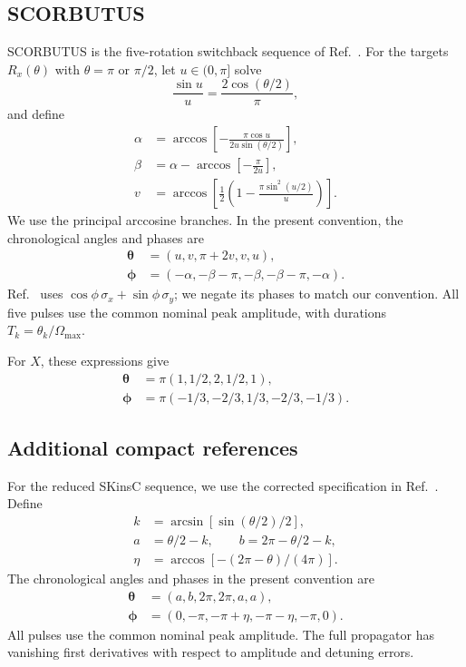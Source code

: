 \documentclass[10pt,aps,twocolumn,pra,floatfix,superscriptaddress]{revtex4-2}
\begin{document}
\subsection{SCORBUTUS}

SCORBUTUS is the five-rotation switchback sequence of
Ref.~\cite{Kukita_2022_switchback}. For the targets $R_x(\theta)$
with $\theta=\pi$ or $\pi/2$, let $u\in(0,\pi]$ solve
\begin{equation}
\frac{\sin u}{u}=\frac{2\cos(\theta/2)}{\pi},
\end{equation}
and define
\begin{align}
\alpha&=\arccos\!\left[-\frac{\pi\cos u}{2u\sin(\theta/2)}\right],\\
\beta&=\alpha-\arccos\!\left[-\frac{\pi}{2u}\right],\\
v&=\arccos\!\left[\frac12\left(1-\frac{\pi\sin^2(u/2)}{u}\right)\right].
\end{align}
We use the principal arccosine branches. In the present convention,
the chronological angles and phases are
\begin{align}
\boldsymbol\theta&=(u,v,\pi+2v,v,u),\\
\boldsymbol\phi&=(-\alpha,-\beta-\pi,-\beta,-\beta-\pi,-\alpha).
\end{align}
Ref.~\cite{Kukita_2022_switchback} uses $\cos\phi\,\sigma_x+\sin\phi\,\sigma_y$;
we negate its phases to match our convention. All five pulses use
the common nominal peak amplitude, with durations
$T_k=\theta_k/\Omega_{\max}$.

For $X$, these expressions give
\begin{align}
\boldsymbol\theta&=\pi(1,1/2,2,1/2,1),\\
\boldsymbol\phi&=\pi(-1/3,-2/3,1/3,-2/3,-1/3).
\end{align}

\subsection{Additional compact references}

For the reduced SKinsC sequence, we use the corrected specification
in Ref.~\cite{Kukita_2022_switchback}. Define
\begin{align*}
k&=\arcsin[\sin(\theta/2)/2],\\
a&=\theta/2-k,\qquad b=2\pi-\theta/2-k,\\
\eta&=\arccos[-(2\pi-\theta)/(4\pi)].
\end{align*}
The chronological angles and phases in the present convention are
\begin{align}
\boldsymbol\theta&=(a,b,2\pi,2\pi,a,a),\\
\boldsymbol\phi&=(0,-\pi,-\pi+\eta,-\pi-\eta,-\pi,0).
\end{align}
All pulses use the common nominal peak amplitude. The full propagator
has vanishing first derivatives with respect to amplitude and detuning
errors.
\end{document}
